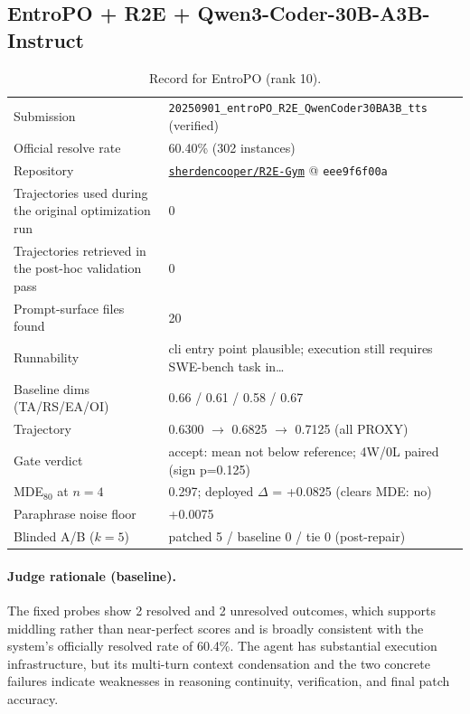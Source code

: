 \subsection{EntroPO + R2E + Qwen3-Coder-30B-A3B-Instruct}
\label{app:agent10}
\begin{table}[H]\centering\scriptsize
\caption{Record for EntroPO (rank 10).}
\begin{tabular}{lp{8.2cm}}\toprule
Submission & \texttt{20250901\_\allowbreak{}entroPO\_\allowbreak{}R2E\_\allowbreak{}QwenCoder30BA3B\_\allowbreak{}tts} (verified) \\
Official resolve rate & 60.40\% (302 instances) \\
Repository & \href{https://github.com/sherdencooper/R2E-Gym}{\texttt{sherdencooper/R2E-Gym}} @ \texttt{eee9f6f00a} \\
Trajectories used during the original optimization run & 0 \\
Trajectories retrieved in the post-hoc validation pass & 0 \\
Prompt-surface files found & 20 \\
Runnability & cli entry point plausible; execution still requires SWE-bench task in\ldots{} \\
Baseline dims (TA/RS/EA/OI) & 0.66 / 0.61 / 0.58 / 0.67 \\
Trajectory & 0.6300 $\to$ 0.6825 $\to$ 0.7125 (all PROXY) \\
Gate verdict & accept: mean not below reference; 4W/0L paired (sign p=0.125) \\
MDE$_{80}$ at $n{=}4$ & 0.297; deployed $\Delta$ = +0.0825 (clears MDE: no) \\
Paraphrase noise floor & +0.0075 \\
Blinded A/B ($k{=}5$) & patched 5 / baseline 0 / tie 0 (post-repair) \\
\bottomrule\end{tabular}\end{table}
\paragraph{Judge rationale (baseline).}
The fixed probes show 2 resolved and 2 unresolved outcomes, which supports middling rather than near-perfect scores and is broadly consistent with the system's officially resolved rate of 60.4\%. The agent has substantial execution infrastructure, but its multi-turn context condensation and the two concrete failures indicate weaknesses in reasoning continuity, verification, and final patch accuracy.
